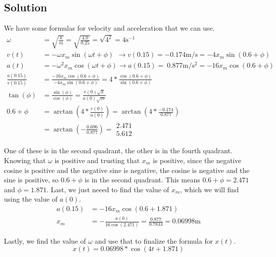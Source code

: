 \documentclass[12pt]{article}
\begin{document}
\subsection{Solution}
We have some formulas for velocity and acceleration that we can use.
\begin{align}
    \omega  &=  \sqrt{\frac{k}{m}}
        =   \sqrt{\frac{4.0}{0.25}} =   \sqrt{4^2}
        =   4\unit{\second^{-1}}\\
    v(t)    &=  -\omega x_m \sin(\omega t + \phi)\ \ \rightarrow
    v(0.15) =   -0.174 \unit{\meter/\second}
        =   -4 x_m \sin(0.6 + \phi)\\
    a(t)    &=  -\omega^2 x_m \cos(\omega t + \phi)\rightarrow
    a(0.15) =   \ 0.877 \unit{\meter/\second^2}
        =   -16 x_m \cos(0.6 + \phi)\\
    \frac{a(0.15)}{v(0.15)} &=  \frac{-16 x_m \cos(0.6 + \phi)}{-4 x_m \sin(0.6 + \phi)}
        =   4*\frac{\cos(0.6 + \phi)}{\sin(0.6 + \phi)}\\
    \tan(\phi)  &=  \frac{\sin(\phi)}{\cos(\phi)}
        =   \frac{v(0)\sqrt{k}}{a(0)\sqrt{m}}\\
    0.6 + \phi  &=  \arctan\left(4*\frac{v(0)}{a(0)}\right)
        =   \arctan\left(4*\frac{-0.174}{0.877}\right)\\
        &=  \arctan\left(-\frac{0.696}{0.877}\right)
        =   \begin{matrix} 2.471 \\ 5.612 \end{matrix}
\end{align}

One of these is in the second quadrant, the other is in the fourth quadrant. Knowing that $\omega$ is positive and trusting that $x_m$ is positive, since the negative cosine is positive and the negative sine is negative, the cosine is negative and the sine is positive, so $0.6 + \phi$ is in the second quadrant. This means $0.6 + \phi = 2.471$ and $\phi = 1.871$. Last, we just neeed to find the value of $x_m$, which we will find using the value of $a(0)$.
\begin{align}
    a(0.15)    &=  -16 x_m \cos(0.6 + 1.871)\\
    x_m &=  -\frac{a(0)}{16\cos(2.471)}
        =   \frac{0.877}{0.7833}
        =   0.06998\unit{\meter}
\end{align}

Lastly, we find the value of $\omega$ and use that to finalize the formula for $x(t)$. 
\begin{equation}
    \boxed{x(t) =  0.06998*\cos(4t + 1.871)}
\end{equation}
\end{document}
